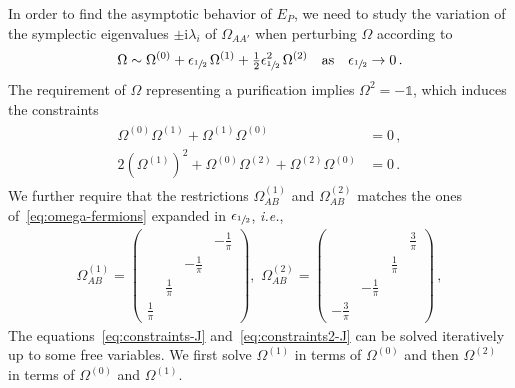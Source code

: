 \documentclass[prl,a4paper,notitlepage,twocolumn,superscriptaddress,longbibliography,reprint]{revtex4-2}
\newcommand{\ii}{\mathrm{i}}
\newcommand{\ie}{{\it i.e.},\ }
\newcommand{\id}{\mathbb{1}} %
\begin{document}
In order to find the asymptotic behavior of $E_P$, we need to study the variation of the symplectic eigenvalues $\pm\ii\lambda_i$ of $\Omega_{AA'}$ when perturbing $\Omega$ according to
\begin{align}
    \Omega\sim \Omega^{(0)}+\epsilon_{\sfrac{1}{2}}\,\Omega^{(1)}+\tfrac{1}{2}\epsilon_{\sfrac{1}{2}}^2\,\Omega^{(2)}\quad\text{as}\quad \epsilon_{\sfrac{1}{2}}\to 0\,.
\end{align}
The requirement of $\Omega$ representing a purification implies $\Omega^2=-\id$, which induces the constraints
\begin{align}
\begin{split}
    \Omega^{(0)}\Omega^{(1)}+\Omega^{(1)}\Omega^{(0)}&=0\,,\\
    2(\Omega^{(1)})^2+\Omega^{(0)}\Omega^{(2)}+\Omega^{(2)}\Omega^{(0)}&=0\,.
\end{split}\label{eq:constraints-J}
\end{align}
We further require that the restrictions $\Omega^{(1)}_{AB}$ and $\Omega^{(2)}_{AB}$ matches the ones of\ \eqref{eq:omega-fermions} expanded in $\epsilon_{\sfrac{1}{2}}$, \ie
\begin{align}
    \Omega^{(1)}_{AB}\!=\!\begin{pmatrix}
    &&& -\frac{1}{\pi}\\
    &&-\frac{1}{\pi}& \\
    &\frac{1}{\pi}&& \\
    \frac{1}{\pi}&&&
    \end{pmatrix},\,\,
    \Omega^{(2)}_{AB}\!=\!\begin{pmatrix}
    &&& \frac{3}{\pi}\\
    &&\frac{1}{\pi}& \\
    &-\frac{1}{\pi}&& \\
    -\frac{3}{\pi}&&&
    \end{pmatrix}\,,\label{eq:constraints2-J}
\end{align}
The equations\ \eqref{eq:constraints-J} and\ \eqref{eq:constraints2-J} can be solved iteratively up to some free variables. We first solve $\Omega^{(1)}$ in terms of $\Omega^{(0)}$ and then $\Omega^{(2)}$ in terms of $\Omega^{(0)}$ and $\Omega^{(1)}$.
\end{document}
